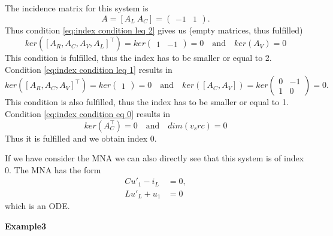 	The incidence matrix for this system is
	\begin{displaymath}
		A = [A_L~A_C] = 
		\left(
		\begin{matrix}
			-1 & 1
		\end{matrix}
		\right).
	\end{displaymath} 
	Thus condition \eqref{eq:index condition leq 2} gives us (empty matrices, thus fulfilled)
	\begin{displaymath}
		ker([A_R, A_C, A_V, A_L]^\top) = ker
		\left(
		\begin{matrix}
			1 & -1
		\end{matrix}
		\right) = 0 
		\quad \text{and} \quad 
		ker(A_V) = 0
	\end{displaymath}
	This condition is fulfilled, thus the index has to be smaller or equal to 2.
	Condition \eqref{eq:index condition leq 1} results in
	\begin{displaymath}
		ker([A_R, A_C, A_V]^\top) = ker\left(
		\begin{matrix}
			1
		\end{matrix}
		\right) = 0
		\quad \text{and} \quad
		ker([A_C, A_V]) = ker
		\left(
		\begin{matrix}
			0 & -1\\
			1 & 0
		\end{matrix}
		\right) = 0.
	\end{displaymath}
	This condition is also fulfilled, thus the index has to be smaller or equal to 1.
	Condition \eqref{eq:index condition eq 0} results in
	\begin{displaymath}
		ker(A_C^\top) = 0 \quad \text{and} \quad dim(v_src) = 0
	\end{displaymath}
	Thus it is fulfilled and we obtain index 0.
	
	If we have consider the MNA we can also directly see that this system is of index 0. The MNA has the form
	\begin{displaymath}
		\begin{aligned}
			C u'_1 - i_L &= 0, \\
			L u'_L + u_1 &= 0
		\end{aligned}
	\end{displaymath}
	which is an ODE.
	
	\textbf{Example3} \\

